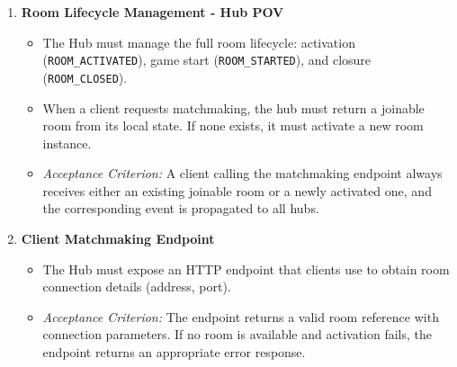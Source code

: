 \begin{enumerate}
    \item \textbf{Room Lifecycle Management - Hub POV}
    \begin{itemize}
        \item The Hub must manage the full room lifecycle: activation (\texttt{ROOM\_ACTIVATED}), game start (\texttt{ROOM\_STARTED}), and closure (\texttt{ROOM\_CLOSED}).
        \item When a client requests matchmaking, the hub must return a joinable room from its local state. If none exists, it must activate a new room instance.
        \item \textit{Acceptance Criterion:} A client calling the matchmaking endpoint always receives either an existing joinable room or a newly activated one, and the corresponding event is propagated to all hubs.
    \end{itemize}

    \item \textbf{Client Matchmaking Endpoint}
    \begin{itemize}
        \item The Hub must expose an HTTP endpoint that clients use to obtain room connection details (address, port).
        \item \textit{Acceptance Criterion:} The endpoint returns a valid room reference with connection parameters. If no room is available and activation fails, the endpoint returns an appropriate error response.
    \end{itemize}
\end{enumerate}

